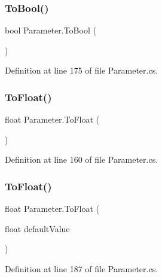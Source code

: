 \mbox{\label{class_parameter_a23508701590a6baf06f7923184d7fa9b}} 
\subsubsection{\texorpdfstring{To\+Bool()}{ToBool()}}
{\footnotesize\ttfamily bool Parameter.\+To\+Bool (\begin{DoxyParamCaption}{ }\end{DoxyParamCaption})}



Definition at line 175 of file Parameter.\+cs.

\mbox{\label{class_parameter_a79393e5f362e4be1a4f18810df271c48}} 
\subsubsection{\texorpdfstring{To\+Float()}{ToFloat()}\hspace{0.1cm}{\footnotesize\ttfamily [1/2]}}
{\footnotesize\ttfamily float Parameter.\+To\+Float (\begin{DoxyParamCaption}{ }\end{DoxyParamCaption})}



Definition at line 160 of file Parameter.\+cs.

\mbox{\label{class_parameter_af9a9b45bd1524d3b70c3005548b7dbc2}} 
\subsubsection{\texorpdfstring{To\+Float()}{ToFloat()}\hspace{0.1cm}{\footnotesize\ttfamily [2/2]}}
{\footnotesize\ttfamily float Parameter.\+To\+Float (\begin{DoxyParamCaption}\item[{float}]{default\+Value }\end{DoxyParamCaption})}



Definition at line 187 of file Parameter.\+cs.

